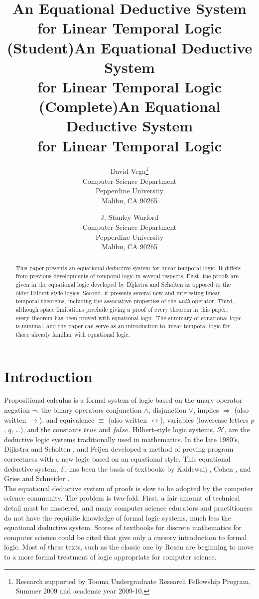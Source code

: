 \documentclass[fleqn, leqno]{article}
\title{An Equational Deductive System\\for Linear Temporal Logic (Student)}
\title{An Equational Deductive System\\for Linear Temporal Logic (Complete)}
\title{An Equational Deductive System\\for Linear Temporal Logic}
\author{David Vega\thanks{Research supported by Tooma Undergraduate Research Fellowship Program, Summer 2009
        and academic year 2009-10.}\\
   Computer Science Department\\
   Pepperdine University\\
   Malibu, CA 90265
   \and
   J. Stanley Warford\\
   Computer Science Department\\
   Pepperdine University\\
   Malibu, CA 90265}
\date{} %
\newcommand{\impl}{\ensuremath{\Rightarrow}}        %
\begin{document}
\maketitle
\begin{abstract}
This paper presents an equational deductive system for linear temporal logic.
It differs from previous developments of temporal logic in several respects.
First, the proofs are given in the equational logic developed by Dijkstra and Scholten as opposed to the older Hilbert-style logics.
Second, it presents several new and interesting linear temporal theorems, including the associative
properties of the \textit{until} operator.
Third, although space limitations preclude giving a proof of every theorem in this paper,
every theorem has been proved with equational logic.
The summary of equational logic is minimal, and the paper can serve as an introduction to linear temporal logic for those 
already familiar with equational logic.
\end{abstract}

\thispagestyle{plain}

\section{Introduction}

Propositional calculus is a formal system of logic based on the unary operator negation $\neg$,
the binary operators conjunction $\land$, disjunction $\lor$, implies $\impl$ (also written $\rightarrow$),
and equivalence $\equiv$ (also written $\leftrightarrow$),
variables (lowercase letters $p$, $q$, \dots), and the constants $true$ and $false$.
Hilbert-style logic systems, $\mathcal{H}$, are the deductive logic systems traditionally used in mathematics.
In the late 1980's, Dijkstra and Scholten \cite{DandS}, and Feijen \cite{Feij} developed a method of proving
program correctness with a new logic based on an equational style.
This equational deductive system, $\mathcal{E}$, has been the basis of textbooks by Kaldewaij \cite{Kald},
Cohen \cite{Cohen}, and Gries and Schneider \cite{LADM}.\\

The equational deductive system of proofs is slow to be adopted by the computer science community.
The problem is two-fold.
First, a fair amount of technical detail must be mastered,
and many computer science educators and practitioners do not have the requisite
knowledge of formal logic systems, much less the equational deductive system.
Scores of textbooks for discrete mathematics for computer science could be cited that give only a cursory introduction to
formal logic. Most of these texts, such as the classic one by Rosen \cite{Rosen} are beginning to move to a more
formal treatment of logic appropriate for computer science.\\
\end{document}
